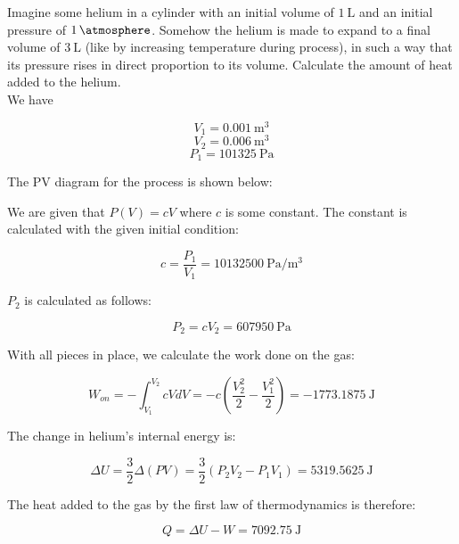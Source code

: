 \documentclass[12pt, a4paper]{article}
\newcounter{exa}
\begin{document}
\begin{texample}
Imagine some helium in a cylinder with an initial volume of $\SI{1}{\liter}$ and an initial pressure of $\SI{1}{\atmosphere}$. Somehow the helium is made to expand to a final volume of $\SI{3}{\liter}$ (like by increasing temperature during process), in such a way that its pressure rises in direct proportion to its volume. Calculate the amount of heat added to the helium. \\

We have

\[V_1=\SI{0.001}{\cubic\meter}\]
\[V_2=\SI{0.006}{\cubic\meter}\]
\[P_1=\SI{101325}{\pascal}\]

The PV diagram for the process is shown below:

\begin{figure}[H]
\centering
{}
\end{figure}

We are given that $P(V)=cV$ where $c$ is some constant. The constant is calculated with the given initial condition:

\[c=\frac{P_1}{V_1}=\SI{10132500}{\pascal\per\cubic\meter}\]

$P_2$ is calculated as follows:

\[P_2=cV_2=\SI{607950}{\pascal}\]

With all pieces in place, we calculate the work done on the gas:

\[W_{on}=-\int_{V_1}^{V_2} cVdV=-c\left( \frac{V_2^2}{2} - \frac{V_1^2}{2} \right)=\SI{-1773.1875}{\joule}\]

The change in helium's internal energy is:

\[\Delta U=\frac{3}{2}\Delta(PV)=\frac{3}{2}(P_2V_2-P_1V_1)=\SI{5319.5625}{\joule}\]

The heat added to the gas by the first law of thermodynamics is therefore:

\[Q=\Delta U-W=\SI{7092.75}{\joule}\]

\end{texample}
\end{document}
